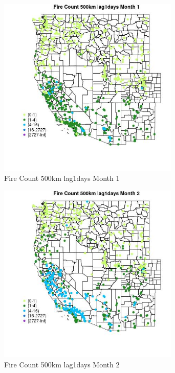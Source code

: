 \begin{figure} 
\centering  
\includegraphics[width=0.77\textwidth]{Code_Outputs/Report_ML_input_PM25_Step4_part_f_de_duplicated_aves_prioritize_24hr_obswNAs_MapObsMo1Fire_Count_500km_lag1days.jpg} 
\caption{\label{fig:Report_ML_input_PM25_Step4_part_f_de_duplicated_aves_prioritize_24hr_obswNAsMapObsMo1Fire_Count_500km_lag1days}Fire Count 500km lag1days Month 1} 
\end{figure} 
 

\begin{figure} 
\centering  
\includegraphics[width=0.77\textwidth]{Code_Outputs/Report_ML_input_PM25_Step4_part_f_de_duplicated_aves_prioritize_24hr_obswNAs_MapObsMo2Fire_Count_500km_lag1days.jpg} 
\caption{\label{fig:Report_ML_input_PM25_Step4_part_f_de_duplicated_aves_prioritize_24hr_obswNAsMapObsMo2Fire_Count_500km_lag1days}Fire Count 500km lag1days Month 2} 
\end{figure} 
 

